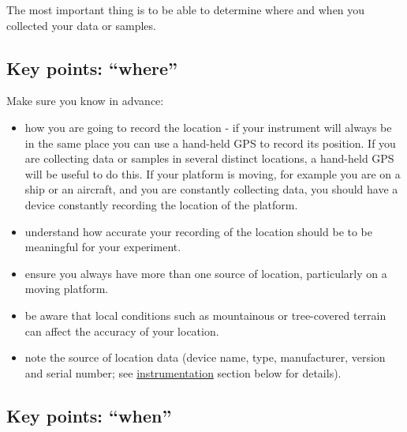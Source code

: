 \documentclass[12pt,a4paper,oneside]{report}
\providecommand{\tightlist}{%
  \setlength{\itemsep}{0pt}\setlength{\parskip}{0pt}}
\begin{document}
The most important thing is to be able to determine where and when you
collected your data or samples.

\hypertarget{key-points-where}{%
\subsection{Key points: ``where''}\label{key-points-where}}

Make sure you know in advance:

\begin{itemize}
\tightlist
\item
  how you are going to record the location - if your instrument will
  always be in the same place you can use a hand-held GPS to record its
  position. If you are collecting data or samples in several distinct
  locations, a hand-held GPS will be useful to do this. If your platform
  is moving, for example you are on a ship or an aircraft, and you are
  constantly collecting data, you should have a device constantly
  recording the location of the platform.
\item
  understand how accurate your recording of the location should be to be
  meaningful for your experiment.
\item
  ensure you always have more than one source of location, particularly
  on a moving platform.
\item
  be aware that local conditions such as mountainous or tree-covered
  terrain can affect the accuracy of your location.
\item
  note the source of location data (device name, type, manufacturer,
  version and serial number; see
  \protect\hyperlink{instrumentation-and-computers}{instrumentation}
  section below for details).
\end{itemize}

\hypertarget{key-points-when}{%
\subsection{Key points: ``when''}\label{key-points-when}}
\end{document}
